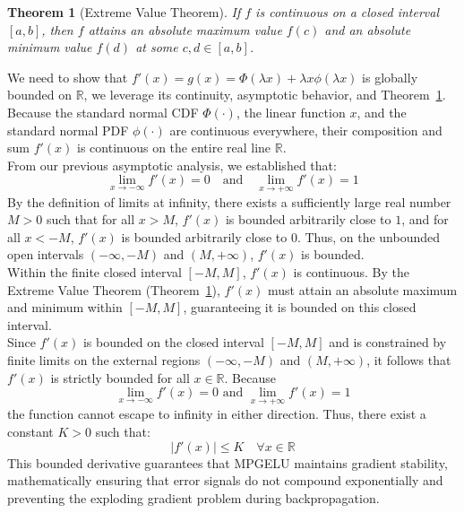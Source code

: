 \documentclass[11pt]{article}
\newtheorem{theorem}{Theorem}[section]
\begin{document}
\begin{theorem}[Extreme Value Theorem]
\label{thm:evt}
If $f$ is continuous on a closed interval $[a,b]$, then $f$ attains an absolute maximum value $f(c)$ and an absolute minimum value $f(d)$ at some $c,d \in [a,b]$.
\end{theorem}

\noindent We need to show that $f'(x) = g(x) = \Phi(\lambda x) + \lambda x \phi(\lambda x)$ is globally bounded on $\mathbb{R}$, we leverage its continuity, asymptotic behavior, and Theorem~\ref{thm:evt}.\\

\noindent Because the standard normal CDF $\Phi(\cdot)$, the linear function $x$, and the standard normal PDF $\phi(\cdot)$ are continuous everywhere, their composition and sum $f'(x)$ is continuous on the entire real line $\mathbb{R}$.\\ 

\noindent From our previous asymptotic analysis, we established that:
\begin{equation*}
\lim_{x \to -\infty} f'(x) = 0 \quad \text{and} \quad \lim_{x \to +\infty} f'(x) = 1
\end{equation*}
By the definition of limits at infinity, there exists a sufficiently large real number $M > 0$ such that for all $x > M$, $f'(x)$ is bounded arbitrarily close to $1$, and for all $x < -M$, $f'(x)$ is bounded arbitrarily close to $0$. Thus, on the unbounded open intervals $(-\infty, -M)$ and $(M, +\infty)$, $f'(x)$ is bounded.\\

\noindent Within the finite closed interval $[-M, M]$, $f'(x)$ is continuous. By the Extreme Value Theorem (Theorem~\ref{thm:evt}), $f'(x)$ must attain an absolute maximum and minimum within $[-M, M]$, guaranteeing it is bounded on this closed interval.\\

\noindent Since $f'(x)$ is bounded on the closed interval $[-M, M]$ and is constrained by finite limits on the external regions $(-\infty, -M)$ and $(M, +\infty)$, it follows that $f'(x)$ is strictly bounded for all $x \in \mathbb{R}$. Because
$$
\displaystyle\lim_{x \to -\infty} f'(x) = 0 \text{ and } \displaystyle\lim_{x \to +\infty} f'(x) = 1$$
the function cannot escape to infinity in either direction. Thus, there exist a constant $K > 0$ such that:
\begin{equation*}
\lvert f'(x) \rvert \le K \quad \forall x \in \mathbb{R}
\end{equation*}
This bounded derivative guarantees that MPGELU maintains gradient stability, mathematically ensuring that error signals do not compound exponentially and preventing the exploding gradient problem during backpropagation.\\
\end{document}
